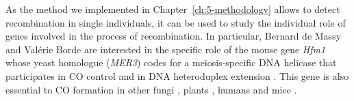 \newpage



As the method we implemented in Chapter~\ref{ch:5-methodology} allows to detect recombination in single individuals, it can be used to study the individual role of genes involved in the process of recombination.
In particular, Bernard de Massy and Valérie Borde are interested in the specific role of the mouse gene \textit{Hfm1} whose yeast homologue (\textit{MER3}) codes for a meiosis-specific DNA helicase \citep{nakagawa1999saccharomyces,nakagawa2002saccharomyces} that participates in CO control and in DNA heteroduplex extension \citep{mazina2004saccharomyces,nakagawa2002mer3}.
This gene is also essential to CO formation in other fungi \citep{sugawara2009coprinus}, plants \citep{mercier2005two,chen2005arabidopsis}, humans \citep{tanaka2006hfm1} and mice \citep{guiraldelli2013mouse}.


